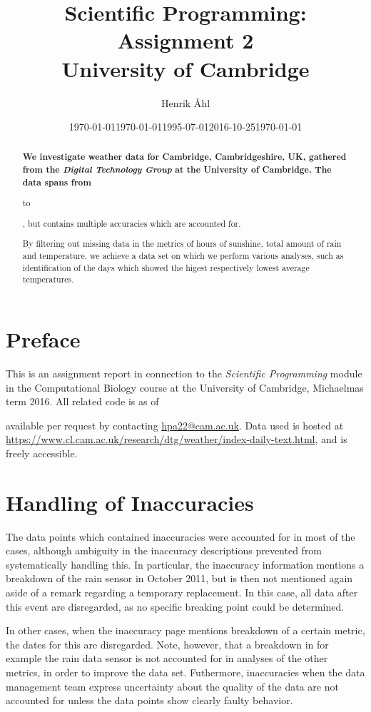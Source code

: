 \documentclass[10pt]{article}\usepackage[]{graphicx}\usepackage[]{color}
\title
{
	\textbf
	{
      Scientific Programming: Assignment 2
  }\\[1em]
  \small{University of Cambridge}
}
\author{Henrik Åhl}
\date{\today}
\theoremstyle{plain}
\begin{document}
\date{\today}
\maketitle
\setcounter{page}{1}
\begin{abstract}
\begin{changemargin}{-.8cm}{-.8cm}
{\bf
  We investigate weather data for Cambridge, Cambridgeshire, UK, gathered from the \textit{Digital Technology Group} at the University of Cambridge. The data spans from \date{1995-07-01} to \date{2016-10-25}, but contains multiple accuracies which are accounted for.
  
\hspace{.5cm}By filtering out missing data in the metrics of hours of sunshine, total amount of rain and temperature, we achieve a data set on which we perform various analyses, such as identification of the days which showed the higest respectively lowest average temperatures. 
}

\end{changemargin} 
\end{abstract}
\section*{Preface}
This is an assignment report in connection to the \textit{Scientific Programming} module in the Computational Biology course at the University of Cambridge, Michaelmas term 2016. All related code is as of \date{\today} available per request by contacting \href{mailto:hpa22@cam.ac.uk}{hpa22@cam.ac.uk}. Data used is hosted at \url{https://www.cl.cam.ac.uk/research/dtg/weather/index-daily-text.html}, and is freely accessible.

\section{Handling of Inaccuracies}
The data points which contained inaccuracies were accounted for in most of the cases, although ambiguity in the inaccuracy descriptions prevented from systematically handling this. In particular, the inaccuracy information mentions a breakdown of the rain sensor in October 2011, but is then not mentioned again aside of a remark regarding a temporary replacement. In this case, all data after this event are disregarded, as no specific breaking point could be determined. 

In other cases, when the inaccuracy page mentions breakdown of a certain metric, the dates for this are disregarded. Note, however, that a breakdown in for example the rain data sensor is not accounted for in analyses of the other metrics, in order to improve the data set. Futhermore, inaccuracies when the data management team express uncertainty about the quality of the data are not accounted for unless the data points show clearly faulty behavior.
\end{document}

